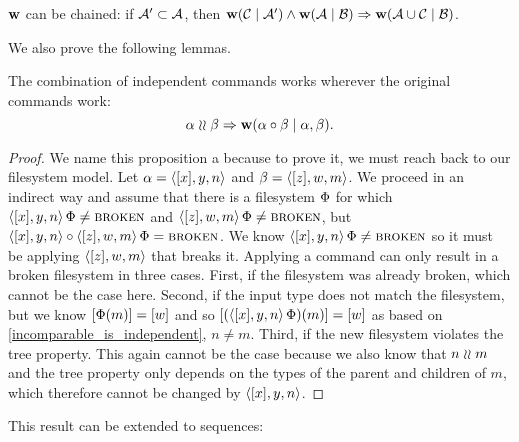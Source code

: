 \begin{mycor}\label{workschained}
$\mathbf{w}$ can be chained:
if $\mathcal{A'}\subset\mathcal{A}$, then
$ \mathbf{w}({\mathcal{C}}\mathrel{|}{\mathcal{A'}}) \wedge \mathbf{w}({\mathcal{A}}\mathrel{|}{\mathcal{B}}) \Rightarrow \mathbf{w}({\mathcal{A}\cup\mathcal{C}}\mathrel{|}{\mathcal{B}})$.
\end{mycor}

We also prove the following lemmas.

\begin{myax}\label{combine_independent_commands}
The combination of independent commands works wherever the original commands work:
\[ \alpha\mathrel{\wr\wr} \beta \Rightarrow \mathbf{w}({\alpha\circ \beta}\mathrel{|}{\alpha, \beta}). \]
\end{myax}
\begin{proof}
We name this proposition a  
because to prove it, we must reach back to our filesystem model.
Let $\alpha=\langle{[x],y,n}\rangle$ and $\beta=\langle{[z],w,m}\rangle$.
We proceed in an indirect way and
assume that there is a filesystem $\Phi$ for which
$\langle{[x],y,n}\rangle\,\Phi\neq\text{\normalfont\scshape{broken}}$ and $\langle{[z],w,m}\rangle\,\Phi\neq\text{\normalfont\scshape{broken}}$, but
$\langle{[x],y,n}\rangle\circ \langle{[z],w,m}\rangle\,\Phi=\text{\normalfont\scshape{broken}}$.
We know $\langle{[x],y,n}\rangle\,\Phi\neq\text{\normalfont\scshape{broken}}$ so it must be applying 
$\langle{[z],w,m}\rangle$ that breaks it.
Applying a command can only result in a broken filesystem in three cases.
First, if the filesystem was already broken, which cannot be the case here.
Second, if the input type does not match the filesystem,
but we know $[\Phi(m)]=[w]$ and so
$[(\langle{[x],y,n}\rangle\,\Phi)(m)]=[w]$ as based on \cref{incomparable_is_independent}, $n\neq m$.
Third, if the new filesystem violates the tree property.
This again cannot be the case because we also know that $n\mathrel{\wr\wr} m$
and the tree property only depends on the types of the parent and children of $m$,
which therefore cannot be changed by $\langle{[x],y,n}\rangle$.
\end{proof}

This result can be extended to sequences:

